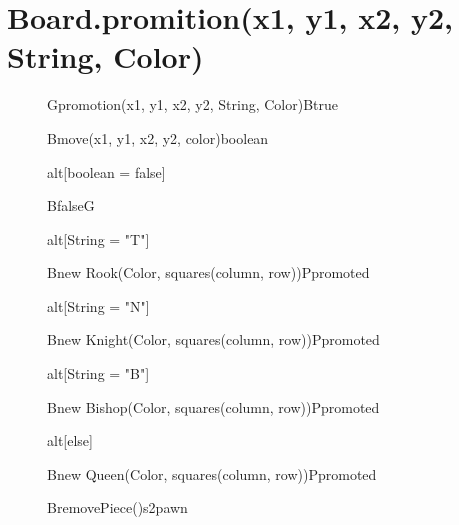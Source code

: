 \documentclass[6pt,landscape]{article}
\begin{document}
\section{Board.promition(x1, y1, x2, y2, String, Color)}
\begin{figure}[H]
	\centering
  	\begin{adjustbox}{width=\textwidth, height=\textheight}
		\begin{sequencediagram}
			
			\begin{call}{G}{promotion(x1, y1, x2, y2, String, Color)}{B}{true}	
				\begin{callself}{B}{move(x1, y1, x2, y2, color)}{boolean}
				\end{callself}
				\begin{sdblock}{alt}{[boolean = false]}
				    \begin{messcall}{B}{false}{G}
					\end{messcall} 	
				\end{sdblock}
				
				\begin{sdblock}{alt}{[String = "T"]}
				    \begin{call}{B}{new Rook(Color, squares(column, row))}{P}{promoted}
					\end{call}
				\end{sdblock}
				\begin{sdblock}{alt}{[String = "N"]}
				    \begin{call}{B}{new Knight(Color, squares(column, row))}{P}{promoted}
					\end{call}
				\end{sdblock}
				\begin{sdblock}{alt}{[String = "B"]}
				    \begin{call}{B}{new Bishop(Color, squares(column, row))}{P}{promoted}
					\end{call}
				\end{sdblock}
				\begin{sdblock}{alt}{[else]}
				    \begin{call}{B}{new Queen(Color, squares(column, row))}{P}{promoted}
					\end{call}
				\end{sdblock}
			
			    \begin{call}{B}{removePiece()}{s2}{pawn}
				\end{call}
				

\end{call}
\end{sequencediagram}
\end{adjustbox}
\end{figure}
\end{document}
